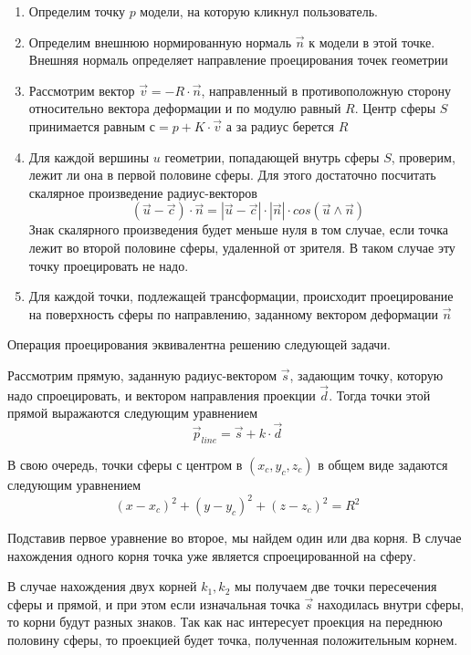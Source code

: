 \documentclass[12pt, a4paper]{article}
\begin{document}
\begin{enumerate}
    \item Определим точку $p$ модели, на которую кликнул пользователь.
    \item Определим внешнюю нормированную нормаль $\vec{n}$ к модели в этой
    точке. Внешняя нормаль определяет направление проецирования точек геометрии
    \item Рассмотрим вектор $\vec{v} = - R \cdot \vec{n}$,
    направленный в противоположную сторону относительно вектора деформации и по
    модулю равный $R$. Центр сферы $S$ принимается равным $с = p + K \cdot \vec{v}$
    а за радиус берется $R$
    \item Для каждой вершины $u$ геометрии, попадающей внутрь сферы $S$, проверим,
    лежит ли она в первой половине сферы. Для этого достаточно посчитать
    скалярное произведение радиус-векторов
    $$(\vec{u}-\vec{c}) \cdot \vec{n} = |\vec{u}-\vec{c}| \cdot |\vec{n}| \cdot
    cos(\vec{u} \wedge \vec{n})$$
    Знак скалярного произведения будет меньше нуля в том случае,
    если точка лежит во второй половине сферы, удаленной от зрителя. В таком
    случае эту точку проецировать не надо.
    \item Для каждой точки, подлежащей трансформации, происходит проецирование на
    поверхность сферы по направлению, заданному вектором деформации $\vec{n}$
\end{enumerate}

Операция проецирования эквивалентна решению следующей задачи.

Рассмотрим прямую, заданную радиус-вектором $\vec{s}$, задающим точку, которую
надо спроецировать, и вектором направления проекции $\vec{d}$. Тогда точки этой
прямой выражаются следующим уравнением
$$ \vec{p}_{line} = \vec{s} + k \cdot \vec{d} $$

В свою очередь, точки сферы с центром в $(x_c, y_c, z_c)$ в общем виде задаются
следующим уравнением
$$ (x-x_c)^2 + (y-y_c)^2 + (z-z_c)^2 = R^2 $$

Подставив первое уравнение во второе, мы найдем один или два корня. В случае
нахождения одного корня точка уже является спроецированной на сферу.

В случае нахождения двух корней $k_1, k_2$ мы получаем две точки пересечения
сферы и прямой, и при этом если изначальная точка $\vec{s}$ находилась внутри
сферы, то корни будут разных знаков. Так как нас интересует проекция на переднюю
половину сферы, то проекцией будет точка, полученная положительным корнем.
\end{document}
